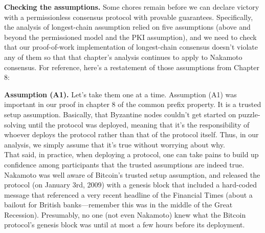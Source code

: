 \noindent
\textbf{Checking the assumptions.} Some chores remain before we can declare victory with
a permissionless consensus protocol with provable guarantees. Specifically, the analysis of
longest-chain assumption relied on five assumptions (above and beyond the permissioned
model and the PKI assumption), and we need to check that our proof-of-work implementation
of longest-chain consensus doesn't violate any of them so that that chapter’s analysis continues
to apply to Nakamoto consensus. For reference, here’s a restatement of those assumptions
from Chapter 8:

\noindent
\textbf{Assumption (A1).} Let’s take them one at a time. Assumption (A1) was important in
our proof in chapter 8 of the common prefix property. It is a trusted setup assumption.
Basically, that Byzantine nodes couldn't get started on puzzle-solving until the protocol was
deployed, meaning that it’s the responsibility of whoever deploys the protocol rather than
that of the protocol itself. Thus, in our analysis, we simply assume that it's true without
worrying about why.\\
That said, in practice, when deploying a protocol, one can take pains to build up confidence among participants that the trusted assumptions are indeed true. Nakamoto was
well aware of Bitcoin’s trusted setup assumption, and released the protocol (on January 3rd,
2009) with a genesis block that included a hard-coded message that referenced a very recent
headline of the Financial Times (about a bailout for British banks—remember this was in the
middle of the Great Recession). Presumably, no one (not even Nakamoto) knew what
the Bitcoin protocol’s genesis block was until at most a few hours before its deployment.\\

